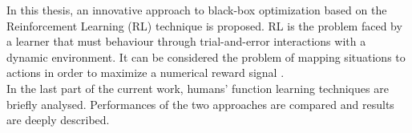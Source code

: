 In this thesis, an innovative approach to black-box optimization based on the Reinforcement Learning (RL) technique is proposed. RL is the problem faced by a learner that must behaviour through trial-and-error interactions with a dynamic environment. It can be considered the problem of mapping situations to actions in order to maximize a numerical reward signal \cite{RLDef1}. \\

In the last part of the current work, humans' function learning techniques are briefly analysed. Performances of the two approaches are compared and results are deeply described.